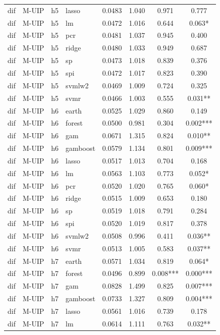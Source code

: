 \begin{ThreePartTable}
\begin{longtable}[t]{llclcccc}
dif & M-UIP & h5 & lasso & 0.0483 & 1.040 & 0.971 & 0.777\\
dif & M-UIP & h5 & lm & 0.0472 & 1.016 & 0.644 & 0.063*\\
dif & M-UIP & h5 & pcr & 0.0481 & 1.037 & 0.945 & 0.400\\
dif & M-UIP & h5 & ridge & 0.0480 & 1.033 & 0.949 & 0.687\\
dif & M-UIP & h5 & sp & 0.0473 & 1.018 & 0.839 & 0.376\\
dif & M-UIP & h5 & spi & 0.0472 & 1.017 & 0.823 & 0.390\\
dif & M-UIP & h5 & svmlw2 & 0.0469 & 1.009 & 0.724 & 0.325\\
dif & M-UIP & h5 & svmr & 0.0466 & 1.003 & 0.555 & 0.031**\\
\addlinespace
dif & M-UIP & h6 & earth & 0.0525 & 1.029 & 0.860 & 0.149\\
dif & M-UIP & h6 & forest & 0.0500 & 0.981 & 0.304 & 0.002***\\
dif & M-UIP & h6 & gam & 0.0671 & 1.315 & 0.824 & 0.010**\\
dif & M-UIP & h6 & gamboost & 0.0579 & 1.134 & 0.801 & 0.009***\\
dif & M-UIP & h6 & lasso & 0.0517 & 1.013 & 0.704 & 0.168\\
dif & M-UIP & h6 & lm & 0.0563 & 1.103 & 0.773 & 0.052*\\
dif & M-UIP & h6 & pcr & 0.0520 & 1.020 & 0.765 & 0.060*\\
dif & M-UIP & h6 & ridge & 0.0515 & 1.009 & 0.653 & 0.180\\
dif & M-UIP & h6 & sp & 0.0519 & 1.018 & 0.791 & 0.284\\
dif & M-UIP & h6 & spi & 0.0520 & 1.019 & 0.817 & 0.378\\
dif & M-UIP & h6 & svmlw2 & 0.0508 & 0.996 & 0.411 & 0.036**\\
dif & M-UIP & h6 & svmr & 0.0513 & 1.005 & 0.583 & 0.037**\\
\addlinespace
dif & M-UIP & h7 & earth & 0.0571 & 1.034 & 0.819 & 0.064*\\
dif & M-UIP & h7 & forest & 0.0496 & 0.899 & 0.008*** & 0.000***\\
dif & M-UIP & h7 & gam & 0.0828 & 1.499 & 0.825 & 0.007***\\
dif & M-UIP & h7 & gamboost & 0.0733 & 1.327 & 0.809 & 0.004***\\
dif & M-UIP & h7 & lasso & 0.0561 & 1.016 & 0.739 & 0.178\\
dif & M-UIP & h7 & lm & 0.0614 & 1.111 & 0.763 & 0.032**\\

\end{longtable}
\end{ThreePartTable}
